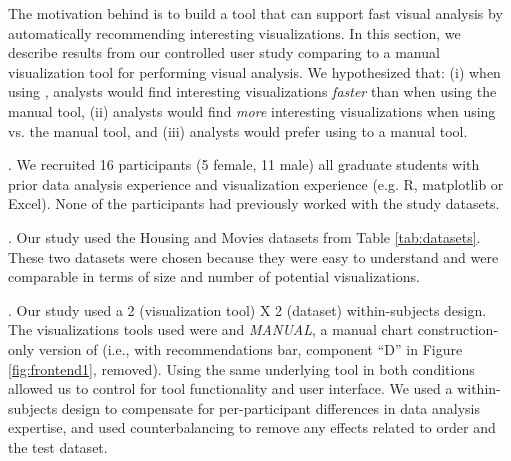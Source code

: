 The motivation behind \SeeDB is to build a tool that can support fast
visual analysis by automatically recommending interesting visualizations.
In this section, we describe results from our controlled user study comparing 
\SeeDB to a manual visualization tool for performing visual analysis. 
We hypothesized that: (i) when using \SeeDB, analysts would find interesting 
visualizations {\em faster} than when using the manual tool, (ii) analysts
would find {\it more} interesting visualizations when using \SeeDB vs. the 
manual tool, and (iii) analysts would prefer using \SeeDB to a manual tool.


. We recruited 16 participants (5 female, 11
 male) all graduate students with prior data analysis experience and visualization
 experience (e.g. R, matplotlib or Excel).
 None of the participants had previously worked with the study datasets.

 . Our study used the Housing and Movies datasets from 
 Table \ref{tab:datasets}.
 These two datasets were chosen because they were easy to understand and 
 were comparable in terms of size and number of potential visualizations.

.
Our study used a 2 (visualization tool) X 2 (dataset) within-subjects design.
The visualizations tools used were \SeeDB and {\em MANUAL}, a manual chart
construction-only version of \SeeDB (i.e., \SeeDB with recommendations bar, 
component ``D'' in Figure \ref{fig:frontend1}, removed).
Using the same underlying tool in both conditions allowed us to control for
tool functionality and user interface.
We used a within-subjects design to compensate for per-participant differences 
in data analysis expertise, and used counterbalancing to remove any effects 
related to order and the test dataset.

